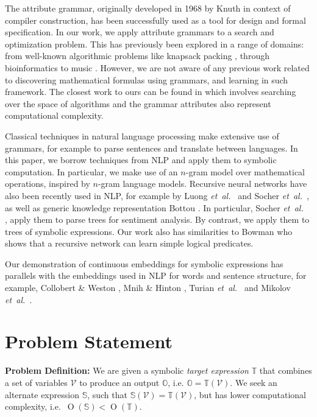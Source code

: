 \documentclass{article} %
\def\etal{{\textit{et~al.~}}}
\newcommand{\BigO}[1]{\ensuremath{\operatorname{O}\left(#1\right)}}
\begin{document}
The attribute grammar, originally developed in 1968 by Knuth \cite{knuth1968semantics} in context of compiler
construction, has been successfully used as a tool for design and formal specification.
In our work, we apply attribute grammars to a search and optimization
problem. This has previously been explored in a range of domains: from
well-known algorithmic problems like knapsack packing
\cite{o2004solving}, through bioinformatics
\cite{waldispuhl2002approximate} to music \cite{desainte1994using}.
However, we are not aware of any previous work related to discovering
mathematical formulas using grammars, and learning in such framework. 
The closest work to ours can be
found in \cite{cheung1999attribute} which involves searching over the
space of algorithms and the grammar attributes also represent
computational complexity.


Classical techniques in natural language processing make extensive use
of grammars, for example to parse sentences and translate between
languages.  In this paper, we borrow techniques from NLP and apply
them to symbolic computation. In particular, we make use of an
$n$-gram model over mathematical operations, inspired by $n$-gram
language models. Recursive neural networks have also been recently
used in NLP, for example by Luong \etal \cite{luong2013better} and
Socher \etal \cite{socher2010learning,socher2013recursive}, as well as generic knowledge representation
Bottou \cite{bottou2014machine}. In particular, Socher \etal
\cite{socher2013recursive}, apply them to parse trees for sentiment
analysis. By contrast, we apply them to trees of symbolic expressions.
Our work also has similarities to Bowman \cite{bowman2013can} who shows that a recursive network can
learn simple logical predicates.

Our demonstration of continuous embeddings for symbolic expressions
has parallels with the embeddings used in NLP for words and sentence
structure, for example, Collobert \& Weston
\cite{Collobert08}, Mnih \& Hinton \cite{Mnih09}, Turian \etal \cite{Turian10}
and Mikolov \etal \cite{mikolov2013efficient}.


\section{Problem Statement}

{\noindent \bf Problem Definition:} We are given a symbolic {\em target expression}
$\mathbb{T}$ that combines a set of variables $\mathcal{V}$ to produce
an output $\mathbb{O}$, i.e. $\mathbb{O}=\mathbb{T}(\mathcal{V})$. We seek an alternate
expression $\mathbb{S}$, such that $\mathbb{S}(\mathcal{V})=\mathbb{T}(\mathcal{V})$, but has lower
computational complexity, i.e.~$\BigO{\mathbb{S}} < \BigO{\mathbb{T}}$. 
\end{document}
